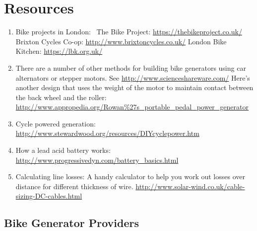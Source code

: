 \documentclass{article}
\theoremstyle{definition}
\theoremstyle{definition}
\theoremstyle{remark}
\begin{document}


\section{Resources} %
\label{sec:resources}

  \begin{enumerate}
    \item Bike projects in London:  \newline
      The Bike Project: \href{https://thebikeproject.co.uk/}{https://thebikeproject.co.uk/} \newline
      Brixton Cycles Co-op: \href{http://www.brixtoncycles.co.uk/}{http://www.brixtoncycles.co.uk/} \newline
      London Bike Kitchen: \href{https://lbk.org.uk/}{https://lbk.org.uk/} \newline
    \item There are a number of other methods for building bike generators using car alternators or stepper motors. See \href{http://www.scienceshareware.com/}{http://www.scienceshareware.com/} \newline
      Here’s another design that uses the weight of the motor to maintain contact between the back wheel and the roller: \href{http://www.appropedia.org/Rowan\%27s\_portable\_pedal\_power\_generator}{http://www.appropedia.org/Rowan\%27s\_portable\_pedal\_power\_generator}
    \item Cycle powered generation: \href{http://www.stewardwood.org/resources/DIYcyclepower.htm}{http://www.stewardwood.org/resources/DIYcyclepower.htm}
    \item How a lead acid battery works: \href{http://www.progressivedyn.com/battery_basics.html}{http://www.progressivedyn.com/battery\_basics.html}
    \item Calculating line losses: A handy calculator to help you work out losses over distance for different thickness of wire. \href{http://www.solar-wind.co.uk/cable-sizing-DC-cables.html}{http://www.solar-wind.co.uk/cable-sizing-DC-cables.html}
  \end{enumerate}

  \subsection{Bike Generator Providers} %
  \label{sub:bike_generator_providers}
  
\end{document}
